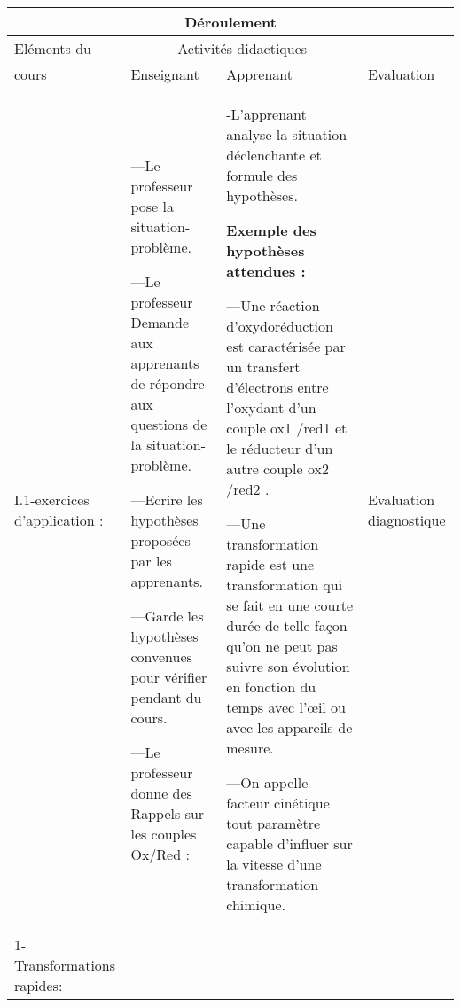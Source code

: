 \documentclass[12pt]{article}
\begin{document}
\begin{center}
	 \begin{tabular}{|p{}||p{}||p{}||p{}|}
\hline
\multicolumn{4}{|c|}{Déroulement}\\\hline
Eléments du & \multicolumn{2}{c||}{Activités didactiques} &  \\\cline{2-3}
cours & Enseignant & Apprenant & Evaluation\\\hline

\color{red}{I -Rappels sur les couples Ox/Red :}	 

\vspace{0.5cm}
\color{blue}I.1-exercices d’application :
\vspace{0.5cm}

	  &
---Le professeur pose la situation-problème.

---Le professeur Demande aux apprenants de répondre aux questions de la situation-problème.

---Ecrire les hypothèses proposées par les apprenants.

---Garde les hypothèses convenues pour vérifier pendant
du cours.

---Le professeur donne des Rappels sur les couples Ox/Red :
				  &
				  -L’apprenant analyse la situation déclenchante
et formule des hypothèses.

\textbf{Exemple des hypothèses attendues :}

---Une réaction d’oxydoréduction est caractérisée par un transfert d’électrons entre l’oxydant d’un couple
ox1 /red1 et le réducteur d’un autre couple ox2 /red2 .

---Une transformation rapide est une transformation qui se fait en une courte durée de
telle façon qu’on ne peut pas suivre son évolution en fonction du temps avec l’œil ou
avec les appareils de mesure.

---On appelle facteur cinétique tout paramètre capable d’influer sur la vitesse d’une transformation chimique.

\vspace{0.5cm}

				  &
				  Evaluation
diagnostique\\\hline


\color{red}{II- Transformations lentes et transformations rapides :}
\vspace{0.5cm}

\color{blue}1-Transformations rapides:
\vspace{0.5cm}


\end{tabular}
\end{center}
\end{document}
